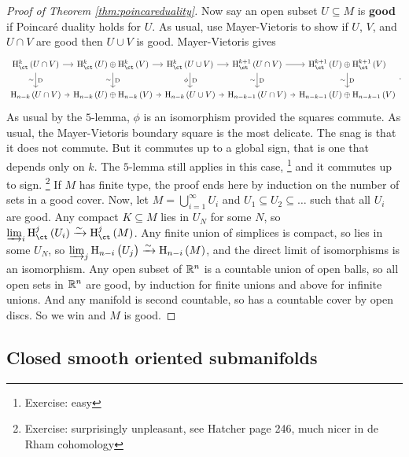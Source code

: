 \begin{proof}[Proof of Theorem \ref{thm:poincareduality}]
Now say an open subset $ U \subseteq M $ is \textbf{good} if Poincar\'e duality holds for $ U $. As usual, use Mayer-Vietoris to show if $ U $, $ V $, and $ U \cap V $ are good then $ U \cup V $ is good. Mayer-Vietoris gives
$$
\begin{tikzcd}[column sep=tiny]
\Hc^k\br{U \cap V} \arrow{r} \arrow{d}{\D}[swap]{\sim} & \Hc^k\br{U} \oplus \Hc^k\br{V} \arrow{r} \arrow{d}{\D}[swap]{\sim} & \Hc^k\br{U \cup V} \arrow{r} \arrow{d}{\D}[swap]{\phi} & \Hc^{k + 1}\br{U \cap V} \arrow{r} \arrow{d}{\D}[swap]{\sim} & \Hc^{k + 1}\br{U} \oplus \Hc^{k + 1}\br{V} \arrow{d}{\D}[swap]{\sim} \\
\H_{n - k}\br{U \cap V} \arrow{r} & \H_{n - k}\br{U} \oplus \H_{n - k}\br{V} \arrow{r} & \H_{n - k}\br{U \cup V} \arrow{r} & \H_{n - k - 1}\br{U \cap V} \arrow{r} & \H_{n - k - 1}\br{U} \oplus \H_{n - k - 1}\br{V}
\end{tikzcd}.
$$
As usual by the $ 5 $-lemma, $ \phi $ is an isomorphism provided the squares commute. As usual, the Mayer-Vietoris boundary square is the most delicate. The snag is that it does not commute. But it commutes up to a global sign, that is one that depends only on $ k $. The $ 5 $-lemma still applies in this case, \footnote{Exercise: easy} and it commutes up to sign. \footnote{Exercise: surprisingly unpleasant, see Hatcher page 246, much nicer in de Rham cohomology} If $ M $ has finite type, the proof ends here by induction on the number of sets in a good cover. Now, let $ M = \bigcup_{i = 1}^\infty U_i $ and $ U_1 \subseteq U_2 \subseteq \dots $ such that all $ U_i $ are good. Any compact $ K \subseteq M $ lies in $ U_N $ for some $ N $, so $ \varinjlim_i \Hc^j\br{U_i} \xrightarrow{\sim} \Hc^j\br{M} $. Any finite union of simplices is compact, so lies in some $ U_N $, so $ \varinjlim_j \H_{n - i}\br{U_j} \xrightarrow{\sim} \H_{n - i}\br{M} $, and the direct limit of isomorphisms is an isomorphism. Any open subset of $ \mathbb{R}^n $ is a countable union of open balls, so all open sets in $ \mathbb{R}^n $ are good, by induction for finite unions and above for infinite unions. And any manifold is second countable, so has a countable cover by open discs. So we win and $ M $ is good.
\end{proof}

\pagebreak

\subsection{Closed smooth oriented submanifolds}


